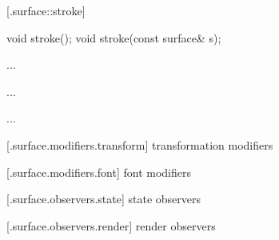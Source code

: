  [\iotwod.surface::stroke] {}

%
%
\begin{itemdecl}
void stroke();
void stroke(const surface& s);
\end{itemdecl}
\begin{itemdescr}
	\pnum
	\effects
	...
	
	\pnum
	\postconditions
	...
	
	\pnum
	\complexity
	...
	
\end{itemdescr}

 [\iotwod.surface.modifiers.transform] { transformation modifiers}

%
%	
%	

 [\iotwod.surface.modifiers.font] { font modifiers}

%
%	
%	

 [\iotwod.surface.observers.state] { state observers}

%
%	
%	

 [\iotwod.surface.observers.render] { render observers}

%
%	
%	

